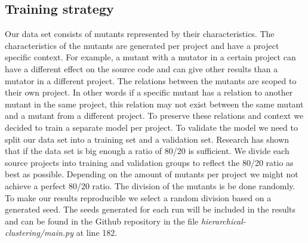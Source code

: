 \documentclass[conference,draftclsnofoot,onecolumn]{IEEEtran}
\begin{document}
\subsection{Training strategy}
\label{ch:training_strategy}
Our data set consists of mutants represented by their characteristics. 
The characteristics of the mutants are generated per project and have a project specific context.
For example, a mutant with a mutator in a certain project can have a different effect on the source code and can give other results than a mutator in a different project.
The relations between the mutants are scoped to their own project. 
In other words if a specific mutant has a relation to another mutant in the same project, this relation may not exist between the same mutant and a mutant from a different project.
To preserve these relations and context we decided to train a separate model per project.
\newline
To validate the model we need to split our data set into a training set and a validation set.
Research has shown that if the data set is big enough a ratio of 80/20 is sufficient\cite{Guyon1997ARatio}.
We divide each source projects into training and validation groups to reflect the 80/20 ratio as best as possible.
Depending on the amount of mutants per project we might not achieve a perfect 80/20 ratio.
The division of the mutants is be done randomly. 
To make our results reproducible we select a random division based on a generated seed.
The seeds generated for each run will be included in the results and can be found in the Github repository in the file \textit{hierarchical-clustering/main.py} at line 182\cite{rbasarat-repo}.
\end{document}
